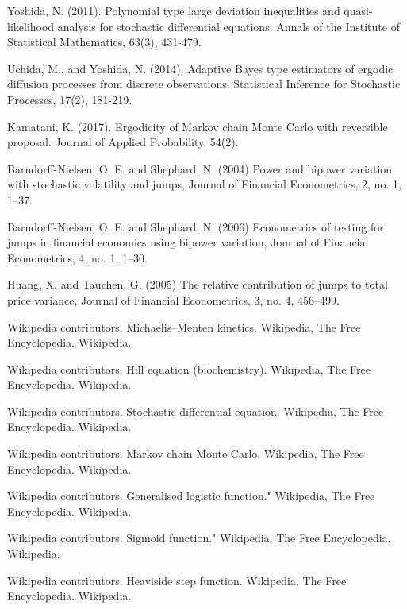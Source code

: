 
\begin{thebibliography}{00}
		
Yoshida, N. (2011). 
\newblock Polynomial type large deviation inequalities and quasi-likelihood analysis for stochastic differential equations. 
\newblock Annals of the Institute of Statistical Mathematics, 63(3), 431-479.

Uchida, M., and Yoshida, N. (2014). 
\newblock Adaptive Bayes type estimators of ergodic diffusion processes from discrete observations. 
\newblock Statistical Inference for Stochastic Processes, 17(2), 181-219.

Kamatani, K. (2017).
\newblock Ergodicity of Markov chain Monte Carlo with reversible proposal. 
\newblock Journal of Applied Probability, 54(2).
	
Barndorff-Nielsen, O. E. and Shephard, N. (2004) 
\newblock Power and bipower variation with stochastic volatility and jumps, 
\newblock Journal of Financial Econometrics, 2, no. 1, 1–37.
	
Barndorff-Nielsen, O. E. and Shephard, N. (2006) 
\newblock Econometrics of testing for jumps in financial economics using bipower variation, 
\newblock Journal of Financial Econometrics, 4, no. 1, 1–30.
	
Huang, X. and Tauchen, G. (2005) 
\newblock The relative contribution of jumps to total price variance, 
\newblock Journal of Financial Econometrics, 3, no. 4, 456–499.

Wikipedia contributors. 
\newblock Michaelis–Menten kinetics. 
\newblock Wikipedia, The Free Encyclopedia. Wikipedia.

Wikipedia contributors. 
\newblock Hill equation (biochemistry).
\newblock Wikipedia, The Free Encyclopedia. Wikipedia. 

Wikipedia contributors. 
\newblock Stochastic differential equation.
\newblock Wikipedia, The Free Encyclopedia. Wikipedia.

Wikipedia contributors. 
\newblock Markov chain Monte Carlo.
\newblock Wikipedia, The Free Encyclopedia. Wikipedia.

Wikipedia contributors. 
\newblock Generalised logistic function." 
\newblock Wikipedia, The Free Encyclopedia. Wikipedia. 

Wikipedia contributors. 
\newblock Sigmoid function." 
\newblock Wikipedia, The Free Encyclopedia. Wikipedia. 

Wikipedia contributors. 
\newblock Heaviside step function.
\newblock Wikipedia, The Free Encyclopedia. Wikipedia.
\end{thebibliography}

